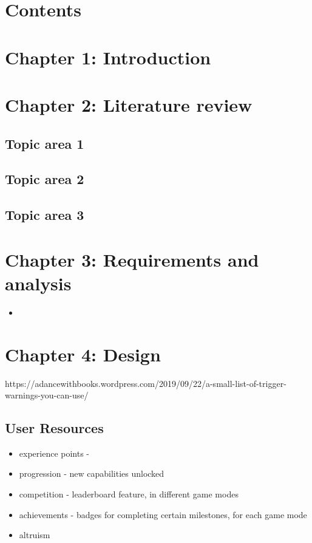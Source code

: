 \documentclass{article}
\begin{document}
\newpage

\section{Contents}
\tableofcontents
\blindtext
\newpage

\section{Chapter 1: Introduction}
\blindtext
\newpage

\section{Chapter 2: Literature review}

\subsection{Topic area 1}
\blindtext
\subsection{Topic area 2}
\blindtext
\subsection{Topic area 3}
\blindtext
\newpage

\section{Chapter 3: Requirements and analysis}
\begin{itemize}
  \item 
\end{itemize}
\blindtext
\newpage

\section{Chapter 4: Design}
https://adancewithbooks.wordpress.com/2019/09/22/a-small-list-of-trigger-warnings-you-can-use/

\subsection{User Resources}
\begin{itemize}
  \item experience points - 
  \item progression - new capabilities unlocked  
  \item competition - leaderboard feature, in different game modes
  \item achievements - badges for completing certain milestones, for each game mode
  \item altruism
\end{itemize}
\end{document}
